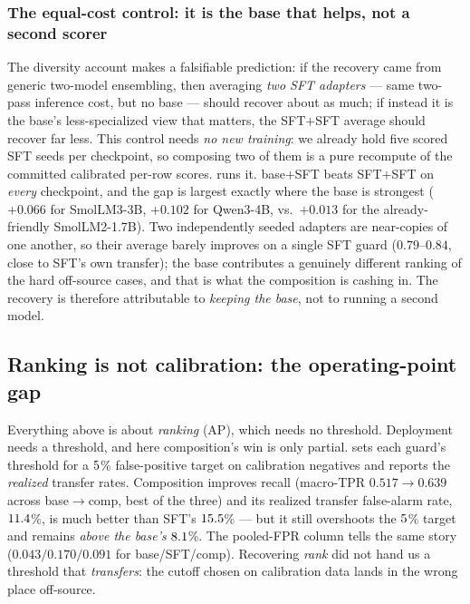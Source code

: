 \subsubsection{The equal-cost control: it is the base that helps, not a second scorer}
\label{sec:actIII-sftsft}

The diversity account makes a falsifiable prediction: if the recovery came from generic two-model
ensembling, then averaging \emph{two SFT adapters} --- same two-pass inference cost, but no base --- should
recover about as much; if instead it is the base's less-specialized view that matters, the SFT$+$SFT
average should recover far less. This control needs \emph{no new training}: we already hold five scored SFT
seeds per checkpoint, so composing two of them is a pure recompute of the committed calibrated per-row
scores.  runs it. base$+$SFT beats SFT$+$SFT on \emph{every} checkpoint, and the gap is
largest exactly where the base is strongest ($+0.066$ for SmolLM3-3B, $+0.102$ for Qwen3-4B, vs.\ $+0.013$
for the already-friendly SmolLM2-1.7B). Two independently seeded adapters are near-copies of one another, so
their average barely improves on a single SFT guard ($0.79$--$0.84$, close to SFT's own transfer); the base
contributes a genuinely different ranking of the hard off-source cases, and that is what the composition is
cashing in. The recovery is therefore attributable to \emph{keeping the base}, not to running a second model.



\subsection{Ranking is not calibration: the operating-point gap}
\label{sec:actIII-operating}

Everything above is about \emph{ranking} (AP), which needs no threshold. Deployment needs a
threshold, and here composition's win is only partial.  sets each guard's
threshold for a $5$\% false-positive target on calibration negatives and reports
the \emph{realized} transfer rates. Composition improves recall (macro-TPR $0.517\!\to\!0.639$
across base$\to$comp, best of the three) and its realized transfer false-alarm rate,
$11.4$\%, is much better than SFT's $15.5$\% --- but
it still overshoots the $5$\% target and remains \emph{above the base's}
$8.1$\%. The pooled-FPR column tells the same story ($0.043/0.170/0.091$ for
base/SFT/comp). Recovering \emph{rank} did not hand us a threshold that \emph{transfers}: the
cutoff chosen on calibration data lands in the wrong place off-source.

